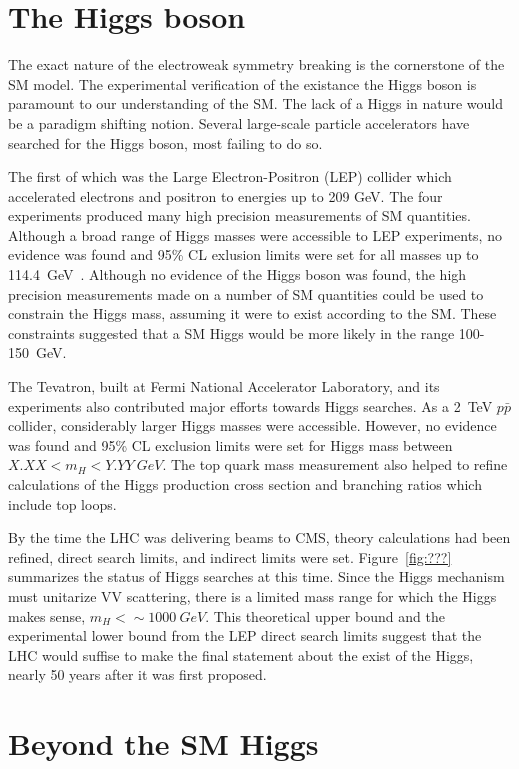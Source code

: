 \section{The Higgs boson}
\label{sec:The Higgs boson}

The exact nature of the
electroweak symmetry breaking is the cornerstone of the SM model.
The experimental verification of the existance the Higgs boson is
paramount to our understanding of the SM.  The lack of a Higgs in 
nature would be a paradigm shifting notion.  
Several large-scale
particle accelerators have searched for the Higgs boson, most 
failing to do so.

The first of which was the Large Electron-Positron (LEP) collider
which accelerated electrons and positron to energies up to 209 GeV.
The four experiments produced many high precision measurements
of SM quantities.   Although a broad range of Higgs masses 
were accessible to LEP experiments, no evidence was found and 
95\% CL exlusion limits were set for all masses up to 114.4~GeV~\cite{??}.
Although no evidence of the Higgs boson was 
found, the high precision measurements made on a number of SM 
quantities could be used to constrain the Higgs mass, assuming it 
were to exist according to the SM.  These constraints suggested 
that a SM Higgs would be more likely in the range 100-150~GeV.  

The Tevatron, built at Fermi National Accelerator Laboratory, 
and its experiments also contributed major efforts towards Higgs
searches.  As a 2~TeV $p\bar{p}$ collider, considerably larger 
Higgs masses were accessible.  However, no evidence was found
and 95\% CL exclusion limits were set for Higgs mass between
$X.XX<m_H<Y.YY~GeV$.  The top quark mass measurement also helped
to refine calculations of the Higgs production cross section and 
branching ratios which include top loops.  

By the time the LHC was delivering beams to CMS, theory
calculations had been refined, direct search limits, and indirect limits
were set.  Figure~\ref{fig:???} summarizes the status of Higgs 
searches at this time.  Since the Higgs mechanism
must unitarize VV scattering, there is a limited mass range for 
which the Higgs makes sense, $m_H<\sim1000~GeV$. This theoretical
upper bound and the experimental lower bound from the LEP direct
search limits suggest that the LHC would suffise to make the final
statement about the exist of the Higgs, nearly 50 years after it
was first proposed.  

\section{Beyond the SM Higgs}

